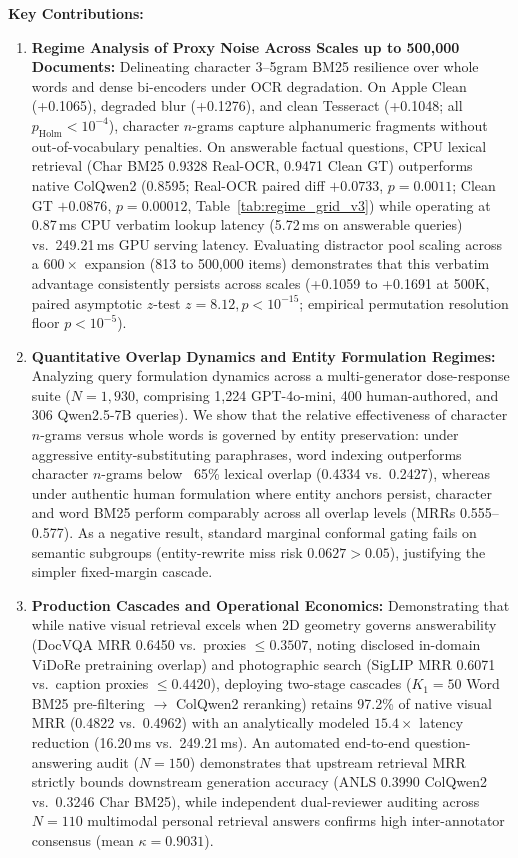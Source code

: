 \textbf{Key Contributions:}
\begin{enumerate}
    \setlength{\itemsep}{0pt}
    \setlength{\parskip}{0pt}
    \setlength{\parsep}{0pt}
    \setlength{\topsep}{1pt}
    \item \textbf{Regime Analysis of Proxy Noise Across Scales up to 500,000 Documents:} Delineating character 3--5gram BM25 resilience over whole words and dense bi-encoders under OCR degradation. On Apple Clean (+0.1065), degraded blur (+0.1276), and clean Tesseract (+0.1048; all $p_{\text{Holm}} < 10^{-4}$), character $n$-grams capture alphanumeric fragments without out-of-vocabulary penalties. On answerable factual questions, CPU lexical retrieval (Char BM25 0.9328 Real-OCR, 0.9471 Clean GT) outperforms native ColQwen2 (0.8595; Real-OCR paired diff $+0.0733$, $p = 0.0011$; Clean GT $+0.0876$, $p = 0.00012$, Table~\ref{tab:regime_grid_v3}) while operating at 0.87\,ms CPU verbatim lookup latency (5.72\,ms on answerable queries) vs.\ 249.21\,ms GPU serving latency. Evaluating distractor pool scaling across a $600\times$ expansion (813 to 500,000 items) demonstrates that this verbatim advantage consistently persists across scales (+0.1059 to +0.1691 at 500K, paired asymptotic $z$-test $z=8.12, p < 10^{-15}$; empirical permutation resolution floor $p < 10^{-5}$).
    \item \textbf{Quantitative Overlap Dynamics and Entity Formulation Regimes:} Analyzing query formulation dynamics across a multi-generator dose-response suite ($N=1{,}930$, comprising 1,224 GPT-4o-mini, 400 human-authored, and 306 Qwen2.5-7B queries). We show that the relative effectiveness of character $n$-grams versus whole words is governed by entity preservation: under aggressive entity-substituting paraphrases, word indexing outperforms character $n$-grams below ~65\% lexical overlap (0.4334 vs.\ 0.2427), whereas under authentic human formulation where entity anchors persist, character and word BM25 perform comparably across all overlap levels (MRRs 0.555--0.577). As a negative result, standard marginal conformal gating fails on semantic subgroups (entity-rewrite miss risk $0.0627 > 0.05$), justifying the simpler fixed-margin cascade.
    \item \textbf{Production Cascades and Operational Economics:} Demonstrating that while native visual retrieval excels when 2D geometry governs answerability (DocVQA MRR 0.6450 vs.\ proxies $\le 0.3507$, noting disclosed in-domain ViDoRe pretraining overlap) and photographic search (SigLIP MRR 0.6071 vs.\ caption proxies $\le 0.4420$), deploying two-stage cascades ($K_1=50$ Word BM25 pre-filtering $\to$ ColQwen2 reranking) retains 97.2\% of native visual MRR (0.4822 vs.\ 0.4962) with an analytically modeled $15.4\times$ latency reduction (16.20\,ms vs.\ 249.21\,ms). An automated end-to-end question-answering audit ($N=150$) demonstrates that upstream retrieval MRR strictly bounds downstream generation accuracy (ANLS 0.3990 ColQwen2 vs.\ 0.3246 Char BM25), while independent dual-reviewer auditing across $N=110$ multimodal personal retrieval answers confirms high inter-annotator consensus (mean $\kappa = 0.9031$).
\end{enumerate}

